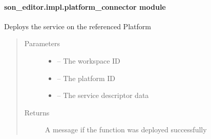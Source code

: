 \documentclass[letterpaper,10pt,english]{sphinxmanual}
\begin{document}
\paragraph{son\_editor.impl.platform\_connector module}
\label{_source/son_editor.impl:son-editor-impl-platform-connector-module}\label{_source/son_editor.impl:module-son_editor.impl.platform_connector}

\begin{fulllineitems}
\label{_source/son_editor.impl:son_editor.impl.platform_connector.create_service_on_platform}
Deploys the service on the referenced Platform
\begin{quote}\begin{description}
\item[{Parameters}] \leavevmode\begin{itemize}
\item {} 
 -- The workspace ID

\item {} 
 -- The platform ID

\item {} 
 -- The service descriptor data

\end{itemize}

\item[{Returns}] \leavevmode
A  message if the function was deployed successfully

\end{description}\end{quote}

\end{fulllineitems}

\end{document}
